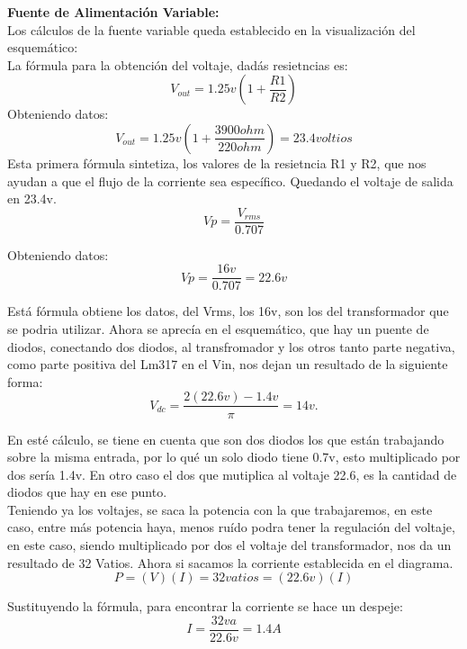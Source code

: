 \documentclass[14pt,a4paper]{article}
\begin{document}
\textbf{Fuente de Alimentación Variable:\\}
Los cálculos de la fuente variable queda establecido en la visualización del esquemático:\\
La fórmula para la obtención del voltaje, dadás resietncias es:\\
$$ V_{out}= 1.25v(1+\frac{R1}{R2}) $$
Obteniendo datos:\\
$$ V_{out}= 1.25v(1+\frac{3900 ohm}{220 ohm})=23.4 voltios $$
Esta primera fórmula sintetiza, los valores de la resietncia R1 y R2, que nos ayudan a que el flujo de la corriente sea específico. Quedando el voltaje de salida en 23.4v.\\

$$ Vp= \frac{V_{rms}}{0.707} $$

Obteniendo datos:\\

$$ Vp=\frac{16v}{0.707}= 22.6 v $$

Está fórmula obtiene los datos, del Vrms, los 16v, son los del transformador que se podria utilizar. Ahora se aprecía en el esquemático, que hay un puente de diodos, conectando dos diodos, al transfromador y los otros tanto parte negativa, como parte positiva del Lm317 en el Vin, nos dejan un resultado de la siguiente forma:\\

$$ V_{dc}=\frac{2(22.6v)-1.4v}{\pi}= 14 v. $$

En esté cálculo, se tiene en cuenta que son dos diodos los que están trabajando sobre la misma entrada, por lo qué un solo diodo tiene 0.7v, esto multiplicado por dos sería 1.4v. En otro caso el dos que mutiplica al voltaje 22.6, es la cantidad de diodos que hay en ese punto.\\
Teniendo ya los voltajes, se saca la potencia con la que trabajaremos, en este caso, entre más potencia haya, menos ruído podra tener la regulación del voltaje, en este caso, siendo multiplicado por dos el voltaje del transformador, nos da un resultado de 32 Vatios. Ahora si sacamos la corriente establecida en el diagrama.\\

$$ P= (V)(I)= 32vatios=(22.6v)(I) $$

Sustituyendo la fórmula, para encontrar la corriente se hace un despeje:\\

$$ I= \frac{32va}{22.6v}= 1.4 A $$
\end{document}
